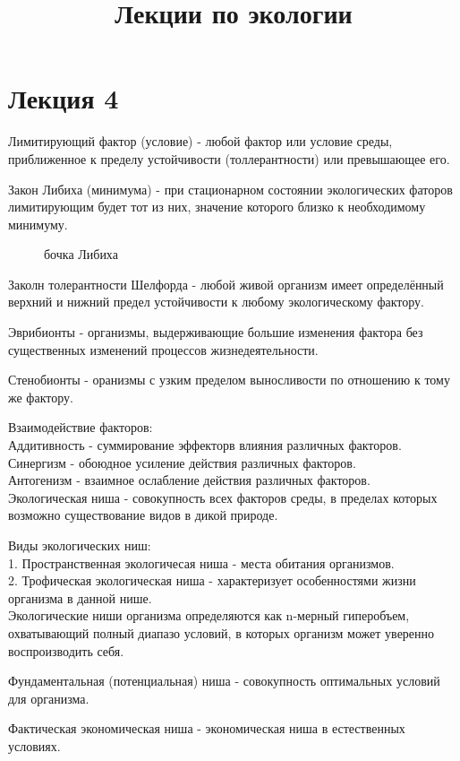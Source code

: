 \title{Лекции по экологии}
\chapter{Лекция 4}

Лимитирующий фактор (условие) - любой фактор или условие среды, приближенное к пределу устойчивости (толлерантности) или превышающее его.

Закон Либиха (минимума) - при стационарном состоянии экологических фаторов лимитирующим будет тот из них, значение которого близко к необходимому минимуму.

\begin{figure}[H]
	\center{\texttt{[image: 0]}}
	\caption{бочка Либиха}
\end{figure}

Заколн толерантности Шелфорда - любой живой организм имеет определённый верхний и нижний предел устойчивости к любому экологическому фактору.

Эврибионты - организмы, выдерживающие большие изменения фактора без существенных изменений процессов жизнедеятельности.

Стенобионты - оранизмы с узким пределом выносливости по отношению к тому же фактору.

Взаимодействие факторов: \\
Аддитивность - суммирование эффекторв влияния различных факторов.\\
Синергизм - обоюдное усиление действия различных  факторов.\\
Антогенизм - взаимное ослабление действия различных факторов.\\

Экологическая ниша - совокупность всех факторов среды, в пределах которых возможно существование видов в дикой природе.

Виды экологических ниш:\\
1. Пространственная экологичесая ниша - места обитания организмов.\\
2. Трофическая экологическая ниша - характеризует особенностями жизни организма в данной нише.\\

Экологические ниши организма определяются как n-мерный гиперобъем, охватывающий полный диапазо условий, в которых организм может уверенно воспроизводить себя.

Фундаментальная (потенциальная) ниша - совокупность оптимальных условий для организма.

Фактическая экономическая ниша - экономическая ниша в естественных условиях.

